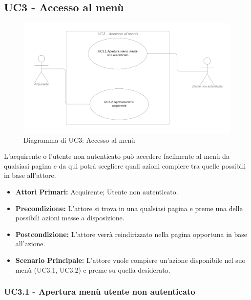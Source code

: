 
\subsection{UC3 - Accesso al menù}\label{UC3}

\begin{figure}[H]
    \centering
    \includegraphics[scale=0.4]{Immagini/DiagrammiUC/UC3AccessoAlMenu.png}
    \caption{Diagramma di UC3: Accesso al menù} 
    \label{fig:AccessoAlMenu}
\end{figure}

L'acquirente o l'utente non autenticato può accedere facilmente al menù da qualsiasi pagina e da qui potrà scegliere quali azioni compiere tra quelle possibili in base all'attore. 
\begin{itemize}
    \item \textbf{Attori Primari:} Acquirente; Utente non autenticato.
    \item \textbf{Precondizione:} L'attore si trova in una qualsiasi pagina e preme una delle possibili azioni messe a disposizione.
    \item \textbf{Postcondizione:} L'attore verrà reindirizzato nella pagina opportuna in base all'azione.
    \item \textbf{Scenario Principale:} L'attore vuole compiere un'azione disponibile nel suo menù (UC3.1, UC3.2) e preme su quella desiderata.
\end{itemize}

\subsubsection{UC3.1 - Apertura menù utente non autenticato} \label{UC3.1}

